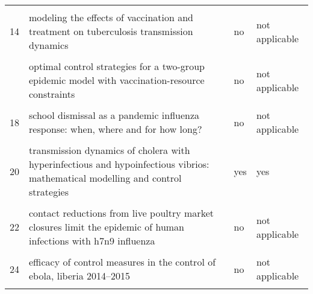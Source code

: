 \documentclass[
]{article}
\begin{document}
\begin{landscape}
\begin{longtable}{l>{\raggedright\arraybackslash}p{4cm}l>{\raggedright\arraybackslash}p{4cm}}
\cellcolor{gray!6}{13} & \cellcolor{gray!6}{modeling the effectiveness of respiratory protective devices in reducing influenza outbreak} & \cellcolor{gray!6}{no} & \cellcolor{gray!6}{not applicable}\\
14 & modeling the effects of vaccination and treatment on tuberculosis transmission dynamics & no & not applicable\\
\cellcolor{gray!6}{15} & \cellcolor{gray!6}{optimal control and cost-effective analysis of the 2017 meningitis outbreak in nigeria} & \cellcolor{gray!6}{yes} & \cellcolor{gray!6}{no}\\
\addlinespace
16 & optimal control strategies for a two-group epidemic model with vaccination-resource constraints & no & not applicable\\
\cellcolor{gray!6}{17} & \cellcolor{gray!6}{optimal media reporting intensity on mitigating spread of an emerging infectious disease} & \cellcolor{gray!6}{no} & \cellcolor{gray!6}{not applicable}\\
18 & school dismissal as a pandemic influenza response: when, where and for how long? & no & not applicable\\
\cellcolor{gray!6}{19} & \cellcolor{gray!6}{study on modeling simulation and optimal control method for the transmission risk of the ebola virus} & \cellcolor{gray!6}{no} & \cellcolor{gray!6}{not applicable}\\
20 & transmission dynamics of cholera with hyperinfectious and hypoinfectious vibrios: mathematical modelling and control strategies & yes & yes\\
\addlinespace
\cellcolor{gray!6}{21} & \cellcolor{gray!6}{a new epidemics–logistics model: insights into controlling the ebola virus disease in west africa} & \cellcolor{gray!6}{no} & \cellcolor{gray!6}{not applicable}\\
22 & contact reductions from live poultry market closures limit the epidemic of human infections with h7n9 influenza & no & not applicable\\
\cellcolor{gray!6}{23} & \cellcolor{gray!6}{disparities in spread and control of influenza in slums of delhi: findings from an agent-based modelling study} & \cellcolor{gray!6}{yes} & \cellcolor{gray!6}{yes}\\
24 & efficacy of control measures in the control of ebola, liberia 2014–2015 & no & not applicable\\
\cellcolor{gray!6}{25} & \cellcolor{gray!6}{epidemiology of the silent polio outbreak in rahat, israel, based on modeling of environmental surveillance data} & \cellcolor{gray!6}{no} & \cellcolor{gray!6}{not applicable}\\

\end{longtable}
\end{landscape}
\end{document}
